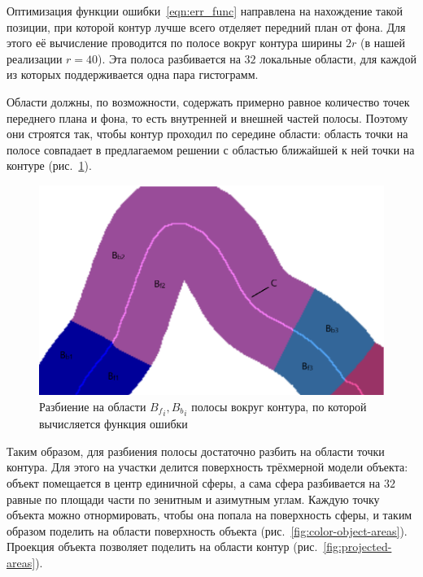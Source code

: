 Оптимизация функции ошибки~\ref{eqn:err_func} направлена на нахождение такой
позиции, при которой контур лучше всего отделяет передний план от фона.
Для этого её вычисление проводится по полосе вокруг контура ширины $2r$ (в нашей
реализации $r = 40$).
Эта полоса разбивается на $32$ локальные области, для каждой из
которых поддерживается одна пара гистограмм.

Области должны, по возможности, содержать примерно равное количество точек
переднего плана и фона, то есть внутренней и внешней частей полосы.
Поэтому они строятся так, чтобы контур проходил по середине области: область
точки на полосе совпадает в предлагаемом решении с областью ближайшей
к ней точки на контуре (рис.~\ref{fig:fb_contour}).

\begin{figure}[t]
\centering
\includegraphics[width=\textwidth]{fig/fb_contour.png}
\caption{
Разбиение на области ${B_f}_i, {B_b}_i$ полосы вокруг контура, по которой
вычисляется функция ошибки
} \label{fig:fb_contour}
\end{figure}

Таким образом, для разбиения полосы достаточно разбить на области точки контура.
Для этого на участки делится поверхность трёхмерной модели
объекта: объект помещается в центр единичной сферы, а сама сфера разбивается
на $32$ равные по площади части по зенитным и азимутным углам.
Каждую точку объекта можно отнормировать, чтобы она попала на поверхность
сферы, и таким образом поделить на области поверхность объекта
(рис.~\ref{fig:color-object-areas}).
Проекция объекта позволяет поделить на области контур
(рис.~\ref{fig:projected-areas}).

